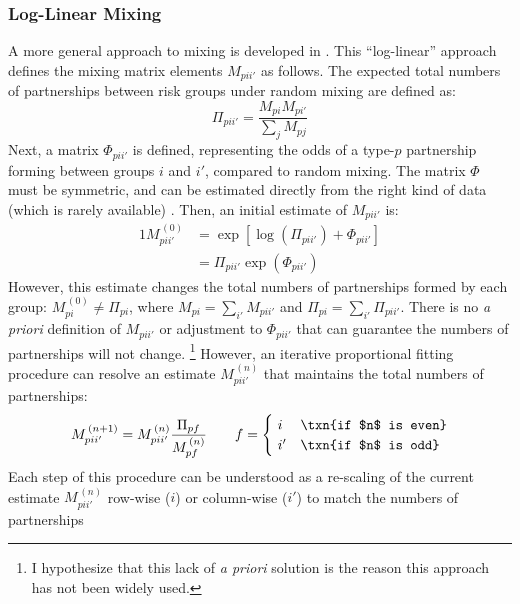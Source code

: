 \subsubsection{Log-Linear Mixing}\label{model.par.mix.ll}
A more general  approach to mixing is developed in \cite{Morris1991}.
This ``log-linear'' approach defines the mixing matrix elements $M_{pii'}$ as follows.
The expected total numbers of partnerships between risk groups under random mixing are defined as:
\begin{equation}\label{eq:mix.rand}
  \Pi_{pii'} = \frac{M_{pi} M_{pi'}}{\sum_{j} M_{pj}}
\end{equation}
Next, a matrix $\Phi_{pii'}$ is defined, representing the odds of
a type-$p$ partnership forming between groups $i$ and $i'$, compared to random mixing.
The matrix $\Phi$ must be symmetric,
and can be estimated directly from the right kind of data
(which is rarely available) \cite{Morris1991}.
Then, an initial estimate of $M_{pii'}$ is:
\begin{alignat}{1}
  M_{pii'}^{\,(0)} &= \exp{\left[\log{\left(\Pi_{pii'}\right)} + \Phi_{pii'} \right]} \nonumber\\
                 &= \Pi_{pii'} \exp{\left(\Phi_{pii'}\right)} \label{eq:mix.M0}
\end{alignat}
However, this estimate changes the total numbers of partnerships formed by each group:
$M_{pi}^{\,(0)} \ne \Pi_{pi}$, where
$M_{pi} = \sum_{i'} M_{pii'}$ and $\Pi_{pi} = \sum_{i'} \Pi_{pii'}$.
There is no \textit{a priori} definition of $M_{pii'}$ or adjustment to $\Phi_{pii'}$
that can guarantee the numbers of partnerships will not change.%
\footnote{I hypothesize that this lack of \textit{a priori} solution
  is the reason this approach has not been widely used.}
However, an iterative proportional fitting procedure \cite{Ruschendorf1995}
can resolve an estimate $M_{pii'}^{\,(n)}$ that maintains the total numbers of partnerships:
\begin{equation}\label{eq:mix.iter}
  M_{pii'}^{\,(n+1)} = M_{pii'}^{\,(n)} \frac{\Pi_{pf}}{M_{pf}^{\,(n)}}
  \qquad f = \begin{cases}
    ~i  & \txn{if $n$ is even} \\
    ~i' & \txn{if $n$ is odd}
  \end{cases}
\end{equation}
Each step of this procedure can be understood as
a re-scaling of the current estimate $M_{pii'}^{\,(n)}$
row-wise ($i$) or column-wise ($i'$) to match the numbers of partnerships
